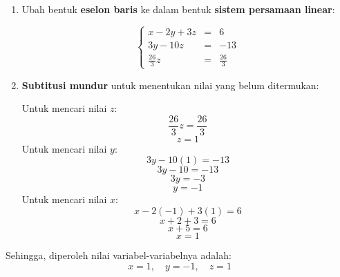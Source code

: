 \documentclass{article}
\begin{document}
\begin{enumerate}
\begin{enumerate}
        \item Ubah bentuk \textbf{eselon baris} ke dalam bentuk \textbf{sistem persamaan linear}:
        
        \[
        \left\{
        \begin{array}{rcl}
        x - 2y + 3z &=& 6 \\
        3y - 10z &=& -13 \\
        \frac{26}{3}z &=& \frac{26}{3}
        \end{array}
        \right.
        \]

        \item \textbf{Subtitusi mundur} untuk menentukan nilai yang belum ditermukan:
        
        Untuk mencari nilai \( z \):
        \[
        \frac{26}{3}z = \frac{26}{3}
        \]
        \[
        z = 1
        \]
        Untuk mencari nilai \( y \):
        \[
        3y - 10(1) = -13
        \]
        \[
        3y - 10 = -13
        \]
        \[
        3y = -3
        \]
        \[
        y = -1
        \]
        Untuk mencari nilai \( x \):
        \[
        x - 2(-1) + 3(1) = 6
        \]
        \[
        x + 2 + 3 = 6
        \]
        \[
        x + 5 = 6
        \]
        \[
        x = 1
        \]
    \end{enumerate}
\end{enumerate}

Sehingga, diperoleh nilai variabel-variabelnya adalah:
\[
x = 1, \quad y = -1, \quad z = 1
\]
\end{document}
